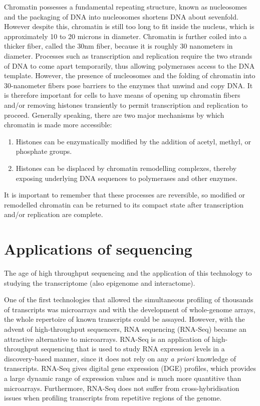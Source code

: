 Chromatin possesses a fundamental repeating structure\cite{holde01111974}, known as nucleosomes and the packaging of DNA into nucleosomes shortens DNA about sevenfold. However despite this, chromatin is still too long to fit inside the nucleus, which is approximately 10 to 20 microns in diameter. Chromatin is further coiled into a thicker fiber, called the 30nm fiber, because it is roughly 30 nanometers in diameter. Processes such as transcription and replication require the two strands of DNA to come apart temporarily, thus allowing polymerases access to the DNA template. However, the presence of nucleosomes and the folding of chromatin into 30-nanometer fibers pose barriers to the enzymes that unwind and copy DNA. It is therefore important for cells to have means of opening up chromatin fibers and/or removing histones transiently to permit transcription and replication to proceed. Generally speaking, there are two major mechanisms by which chromatin is made more accessible:

\begin{enumerate}
   \item Histones can be enzymatically modified by the addition of acetyl, methyl, or phosphate groups.
   \item Histones can be displaced by chromatin remodelling complexes, thereby exposing underlying DNA sequences to polymerases and other enzymes.
\end{enumerate}

It is important to remember that these processes are reversible, so modified or remodelled chromatin can be returned to its compact state after transcription and/or replication are complete.

\section{Applications of sequencing}

The age of high throughput sequencing and the application of this technology to studying the transcriptome (also epigenome and interactome).

One of the first technologies that allowed the simultaneous profiling of thousands of transcripts was microarrays and with the development of whole-genome arrays, the whole repertoire of known transcripts could be assayed. However, with the advent of high-throughput sequencers, RNA sequencing (RNA-Seq) became an attractive alternative to microarrays. RNA-Seq is an application of high-throughput sequencing that is used to study RNA expression levels in a discovery-based manner, since it does not rely on any \textit{a priori} knowledge of transcripts. RNA-Seq gives digital gene expression (DGE) profiles, which provides a large dynamic range of expression values and is much more quantitive than microarrays. Furthermore, RNA-Seq does not suffer from cross-hybridisation issues when profiling transcripts from repetitive regions of the genome.

